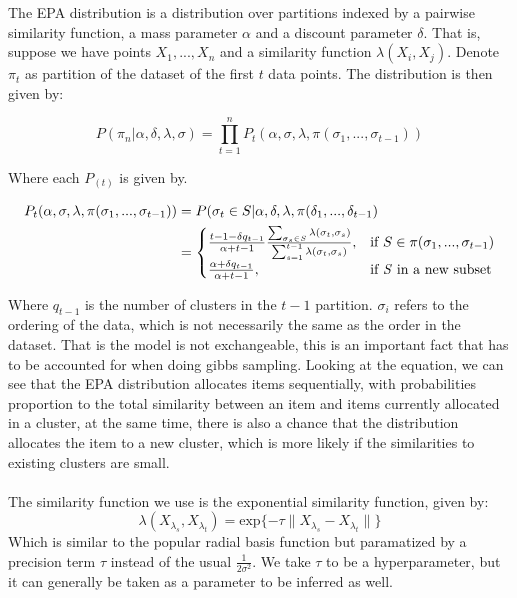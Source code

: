 \documentclass{article}
\begin{document}
The EPA distribution is a distribution over partitions indexed by a pairwise similarity function, a mass parameter $\alpha$ and a discount parameter $\delta$. That is, suppose we have points $X_1,...,X_n$ and a similarity function $\lambda(X_i,X_j)$. Denote $\pi_t$ as partition of the dataset of the first $t$ data points. The distribution is then given by:

\begin{equation}
\label{eqn:EPA Distribution}
P(\pi_n| \alpha, \delta, \lambda, \sigma) = \prod_{t=1}^n P_t(\alpha, \sigma, \lambda, \pi(\sigma_1,...,\sigma_{t-1}))
\end{equation}

Where each $P_(t)$ is given by.

\begin{equation}
\begin{align*}
    P_t(\alpha, \sigma, \lambda, \pi(\sigma_1,...,\sigma_{t-1})) &= P(\sigma_t \in S|\alpha, \delta,\lambda, \pi(\delta_1,...,\delta_{t-1}) \\
    &=\begin{cases}
    \frac{t-1-\delta q_{t-1}}{\alpha + t-1}\frac{\sum_{\sigma_s \in S}\lambda(\sigma_t,\sigma_s)}{\sum_{s=1}^{t-1}\lambda(\sigma_t,\sigma_s)}, & \text{if } S \in \pi(\sigma_1,...,\sigma_{t-1}) \\
     \frac{\alpha + \delta q_{t-1}}{\alpha+t-1}, & \text{if \emph{S} in a new subset}
    \end{cases} 
\end{align*}
\end{equation}

Where $q_{t-1}$ is the number of clusters in the $t-1$ partition. $\sigma_i$ refers to the ordering of the data, which is not necessarily the same as the order in the dataset. That is the model is not exchangeable, this is an important fact that has to be accounted for when doing gibbs sampling. Looking at the equation, we can see that the EPA distribution allocates items sequentially, with probabilities proportion to the total similarity between an item and items currently allocated in a cluster, at the same time, there is also a chance that the distribution allocates the item to a new cluster, which is more likely if the similarities to existing clusters are small.
\\ \\
The similarity function we use is the exponential similarity function, given by:
\begin{equation}
    \lambda(X_{\lambda_s}, X_{\lambda_t}) = \text{exp}\{-\tau \lVert X_{\lambda_s} - X_{\lambda_t} \rVert  \}
\end{equation}
Which is similar to the popular radial basis function but paramatized by a precision term $\tau$ instead of the usual $\frac{1}{2\sigma^2}$. We take $\tau$ to be a hyperparameter, but it can generally be taken as a parameter to be inferred as well.
    
\end{document}
